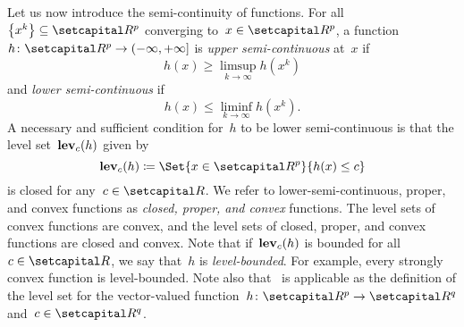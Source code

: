 \documentclass[../main]{subfiles}
\begin{document}
Let us now introduce the semi-continuity of functions.
For all~$\set*{x^k} \subseteq \setR^p$ converging to~$x \in \setR^p$, a function~$h \colon \setR^p \to (-\infty, +\infty]$ is \emph{upper semi-continuous} at~$x$ if
\begin{equation}
    h(x) \ge \limsup_{k \to \infty} h\left(x^k\right) 
\end{equation} 
and \emph{lower semi-continuous} if
\begin{equation}
    h(x) \le \liminf_{k \to \infty} h\left(x^k\right) 
.\end{equation} 
A necessary and sufficient condition for~$h$ to be lower semi-continuous is that the level set~$\operatorname{\mathbf{lev}}_c(h)$ given by
\begin{equation} \label{eq:level}
    \level_c(h) \coloneqq \Set{x \in \setR^p}{h(x) \le c}
\end{equation} 
is closed for any~$c \in \setR$.
We refer to lower-semi-continuous, proper, and convex functions as \emph{closed, proper, and convex} functions.
The level sets of convex functions are convex, and the level sets of closed, proper, and convex functions are closed and convex.
Note that if~$\operatorname{\mathbf{lev}}_c(h)$ is bounded for all~$c \in \setR$, we say that~$h$ is \emph{level-bounded}.
For example, every strongly convex function is level-bounded.
Note also that~ is applicable as the definition of the level set for the vector-valued function~$h \colon \setR^p \to \setR^q$ and~$c \in \setR^q$.
\end{document}
